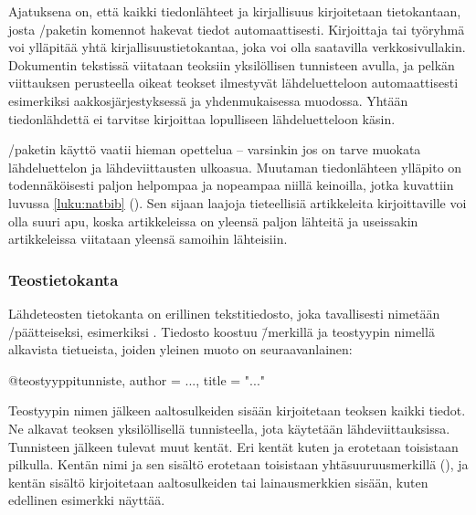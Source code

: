 Ajatuksena on, että kaikki tiedonlähteet ja kirjallisuus kirjoitetaan
tietokantaan, josta \-/paketin komennot hakevat tiedot
automaattisesti. Kirjoittaja tai työryhmä voi ylläpitää yhtä
kirjallisuustietokantaa, joka voi olla saatavilla verkkosivullakin.
Dokumentin tekstissä viitataan teoksiin yksilöllisen tunnisteen avulla,
ja pelkän viittauksen perusteella oikeat teokset ilmestyvät
lähdeluetteloon automaattisesti esimerkiksi aakkosjärjestyksessä ja
yhdenmukaisessa muodossa. Yhtään tiedonlähdettä ei tarvitse kirjoittaa
lopulliseen lähdeluetteloon käsin.

\-/paketin käyttö vaatii hieman opettelua -- varsinkin
jos on tarve muokata lähdeluettelon ja lähdeviittausten ulkoasua.
Muutaman tiedonlähteen ylläpito on todennäköisesti paljon helpompaa ja
nopeampaa niillä keinoilla, jotka kuvattiin luvussa \ref{luku:natbib}
(). Sen sijaan laajoja tieteellisiä artikkeleita
kirjoittaville  voi olla suuri apu, koska
artikkeleissa on yleensä paljon lähteitä ja useissakin artikkeleissa
viitataan yleensä samoihin lähteisiin.

\subsubsection{Teostietokanta}

Lähdeteosten tietokanta on erillinen tekstitiedosto, joka tavallisesti
nimetään \-/päätteiseksi, esimerkiksi .
Tiedosto koostuu \=/merkillä ja teostyypin nimellä alkavista
tietueista, joiden yleinen muoto on seuraavanlainen:

\begin{koodilohkosis}
  @teostyyppi{tunniste,
    author = {...},
    title = "..."
  }
\end{koodilohkosis}

Teostyypin nimen jälkeen aaltosulkeiden sisään kirjoitetaan teoksen
kaikki tiedot. Ne alkavat teoksen yksilöllisellä tunnisteella, jota
käytetään lähdeviittauksissa. Tunnisteen jälkeen tulevat muut kentät.
Eri kentät kuten  ja  erotetaan toisistaan
pilkulla. Kentän nimi ja sen sisältö erotetaan toisistaan
yhtäsuuruusmerkillä (\koodi{=}), ja kentän sisältö kirjoitetaan
aaltosulkeiden tai lainausmerkkien sisään, kuten edellinen esimerkki
näyttää.

